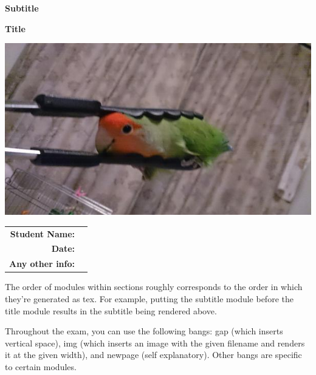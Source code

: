 \documentclass{exam}
\begin{document}
\begin{coverpages}
	\begin{center}
		\vspace{0.05 in}
		\par\noindent\textbf{\large  Subtitle}
		\vspace{0.05 in}
		\vspace{0.10 in}
		\par\noindent\textbf{\Huge   Title}
		\vspace{0.5 in}
		\par\noindent
		\vspace{0.05 in}
		\par\noindent
				\includegraphics[width=.7\textwidth]{images/tong.jpg}
		\vspace{0.05 in}
		\vspace{0.5 in}
		\vspace{0.10 in}
		\vspace{0.15 in}
		\par
		\def\arraystretch{2}\tabcolsep=3pt
		\begin{tabular}{r r}
			\textbf{Student Name:} & \makebox[4in]{\hrulefill} \\
			\textbf{Date:} & \makebox[4in]{\hrulefill} \\
			\textbf{Any other info:} & \makebox[4in]{\hrulefill} \\
		\end{tabular}
		\vspace{0.15 in}
	\end{center}
		\vspace{0.10 in}
	\par\noindent The order of modules within sections roughly corresponds to the order in which they're generated as tex. For example, putting the subtitle module before the title module results in the subtitle being rendered above.
	\par Throughout the exam, you can use the following bangs: gap (which inserts vertical space), img (which inserts an image with the given filename and renders it at the given width), and newpage (self explanatory). Other bangs are specific to certain modules.

\end{coverpages}
\end{document}
